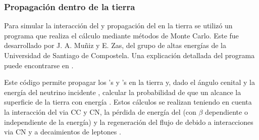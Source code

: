 		\subsubsection{\label{sbsbsc:sim_prop_tierra}Propagaci\'on dentro de la tierra}
	
		Para simular la interacción del \nutau{} y propagaci\'on del \tauon{} en la tierra se utiliz\'o un programa que realiza el c\'alculo mediante m\'etodos de Monte Carlo. Este fue desarrollado por J. A. Mu\~niz y E. Zas, del grupo de altas energ\'ias de la Universidad de Santiago de Compostela.
		Una explicaci\'on detallada del programa puede encontrarse en \cite{gap_tau_tierra}.
		
		Este c\'odigo permite propagar los \nutau{}'s y \tauon{}'s en la tierra y, dado el \'angulo cenital \tita{} y la energ\'ia del neutrino incidente \enu{}, calcular la probabilidad de que un \tauon{} alcance la superficie de la tierra con energ\'ia \etau{}.
		Estos c\'alculos se realizan teniendo en cuenta la interacci\'on del \nutau{} via CC y CN, la p\'erdida de energ\'ia del \tauon{} (con $\beta$
		dependiente o independiente de la energ\'ia) y la regeneraci\'on del flujo de \nutau{} debido a interacciones via CN y a decaimientos de leptones \tauon{}.
		
